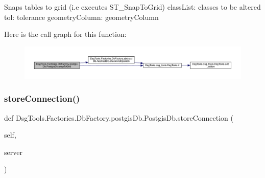 \begin{DoxyVerb}Snaps tables to grid (i.e executes ST_SnapToGrid)
classList: classes to be altered
tol: tolerance
geometryColumn: geometryColumn
\end{DoxyVerb}
 Here is the call graph for this function\+:
\nopagebreak
\begin{figure}[H]
\begin{center}
\leavevmode
\includegraphics[width=350pt]{class_dsg_tools_1_1_factories_1_1_db_factory_1_1postgis_db_1_1_postgis_db_afed8fbc8f90f9ec042cf9f00b9bb4514_cgraph}
\end{center}
\end{figure}
\mbox{\label{class_dsg_tools_1_1_factories_1_1_db_factory_1_1postgis_db_1_1_postgis_db_a70b28af38ea5fc560b5ce30abee0a5b2}} 
\subsubsection{\texorpdfstring{store\+Connection()}{storeConnection()}}
{\footnotesize\ttfamily def Dsg\+Tools.\+Factories.\+Db\+Factory.\+postgis\+Db.\+Postgis\+Db.\+store\+Connection (\begin{DoxyParamCaption}\item[{}]{self,  }\item[{}]{server }\end{DoxyParamCaption})}

